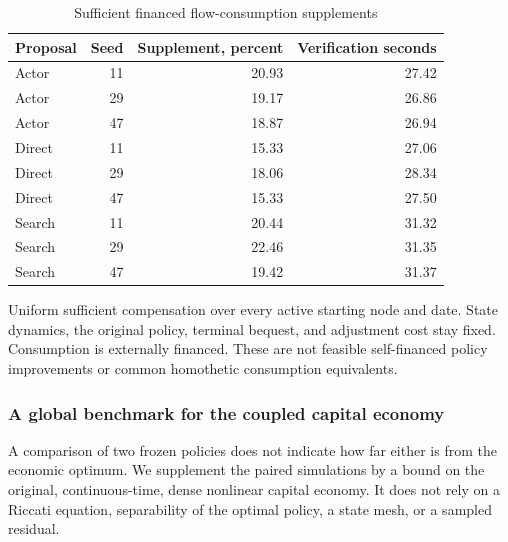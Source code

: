 \begin{table}[htbp]
\centering\small\setlength{\tabcolsep}{4pt}
\caption{Sufficient financed flow-consumption supplements}\label{tab:r9welfare}
\begin{tabular}{lrrr}
\toprule
Proposal & Seed & Supplement, percent & Verification seconds \\
\midrule
Actor & 11 & 20.93 & 27.42 \\
Actor & 29 & 19.17 & 26.86 \\
Actor & 47 & 18.87 & 26.94 \\
Direct & 11 & 15.33 & 27.06 \\
Direct & 29 & 18.06 & 28.34 \\
Direct & 47 & 15.33 & 27.50 \\
Search & 11 & 20.44 & 31.32 \\
Search & 29 & 22.46 & 31.35 \\
Search & 47 & 19.42 & 31.37 \\
\bottomrule
\end{tabular}
\par\vspace{3pt}\begin{minipage}{0.97\linewidth}\footnotesize Uniform sufficient compensation over every active starting node and date. State dynamics, the original policy, terminal bequest, and adjustment cost stay fixed. Consumption is externally financed. These are not feasible self-financed policy improvements or common homothetic consumption equivalents.\end{minipage}
\end{table}



\subsubsection{A global benchmark for the coupled capital economy}\label{sec:r9capital}
A comparison of two frozen policies does not indicate how far either is from the economic optimum. We supplement the paired simulations by a bound on the original, continuous-time, dense nonlinear capital economy. It does not rely on a Riccati equation, separability of the optimal policy, a state mesh, or a sampled residual.

